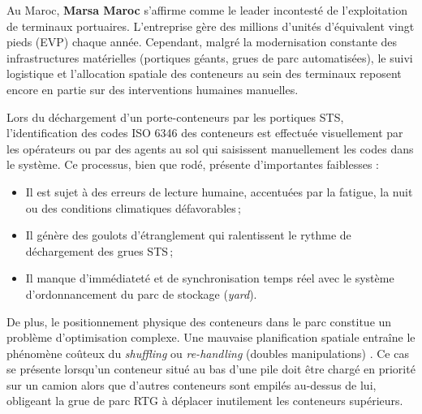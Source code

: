 \documentclass[12pt,a4paper]{article}
\begin{document}
Au Maroc, \textbf{Marsa Maroc} s'affirme comme le leader incontesté de l'exploitation de terminaux portuaires. L'entreprise gère des millions d'unités d'équivalent vingt pieds (EVP) chaque année. Cependant, malgré la modernisation constante des infrastructures matérielles (portiques géants, grues de parc automatisées), le suivi logistique et l'allocation spatiale des conteneurs au sein des terminaux reposent encore en partie sur des interventions humaines manuelles.

Lors du déchargement d'un porte-conteneurs par les portiques \ac{STS}, l'identification des codes ISO 6346 des conteneurs est effectuée visuellement par les opérateurs ou par des agents au sol qui saisissent manuellement les codes dans le système. Ce processus, bien que rodé, présente d'importantes faiblesses :
\begin{itemize}
  \item Il est sujet à des erreurs de lecture humaine, accentuées par la fatigue, la nuit ou des conditions climatiques défavorables\,;
  \item Il génère des goulots d'étranglement qui ralentissent le rythme de déchargement des grues \ac{STS}\,;
  \item Il manque d'immédiateté et de synchronisation temps réel avec le système d'ordonnancement du parc de stockage (\textit{yard}).
\end{itemize}

De plus, le positionnement physique des conteneurs dans le parc constitue un problème d'optimisation complexe. Une mauvaise planification spatiale entraîne le phénomène coûteux du \textit{shuffling} ou \textit{re-handling} (doubles manipulations) \cite{Caserta2011, Jin2015}. Ce cas se présente lorsqu'un conteneur situé au bas d'une pile doit être chargé en priorité sur un camion alors que d'autres conteneurs sont empilés au-dessus de lui, obligeant la grue de parc \ac{RTG} à déplacer inutilement les conteneurs supérieurs.
\end{document}
